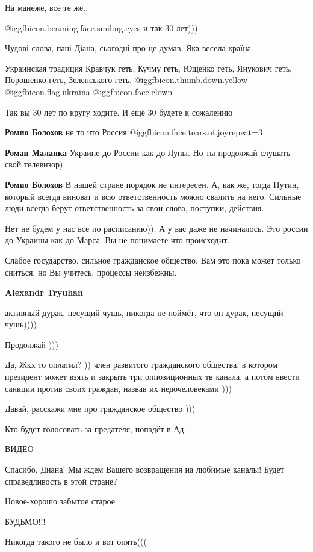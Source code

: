 \begin{itemize}
На манеже, всё те же..

 @igg{fbicon.beaming.face.smiling.eyes}  и так 30 лет)))

Чудові слова, пані Діана, сьогодні про це думав. Яка весела країна.


Украинская традиция Кравчук геть, Кучму геть, Ющенко геть, Янукович геть,
Порошенко геть, Зеленського геть. @igg{fbicon.thumb.down.yellow}
@igg{fbicon.flag.ukraina}  @igg{fbicon.face.clown} 


Так вы 30 лет по кругу ходите.
И ещё 30 будете к сожалению

\begin{itemize} %
\textbf{Ромио Болохов} не то что Россия  @igg{fbicon.face.tears.of.joy}{repeat=3} 

\textbf{Роман Маланка} Украине до России как до Луны. Но ты продолжай слушать свой телевизор)

\textbf{Ромио Болохов} В нашей стране порядок не интересен. А, как же, тогда Путин, который всегда виноват и всю ответственность можно свалить на него. Сильные люди всегда берут ответственность за свои слова, поступки, действия.


Нет не будем у нас всё по расписанию)). А у вас даже не начиналось. Это россии
до Украины как до Марса. Вы не понимаете что происходит.

Слабое государство, сильное гражданское общество. Вам это пока может только
сниться, но Вы учитесь, процессы неизбежны.

\textbf{Alexandr Tryuhan} 

активный дурак, несущий чушь, никогда не поймёт, что он дурак, несущий чушь))))

Продолжай )))

Да, Жкх то оплатил? )) член развитого гражданского общества, в котором
президент может взять и закрыть три оппозиционных тв канала, а потом ввести
санкции против своих граждан, назвав их недочеловеками )))

Давай, расскажи мне про гражданское общество )))

\end{itemize} %

Кто будет голосовать за предателя, попадёт в Ад.

ВИДЕО


Спасибо, Диана! Мы ждем Вашего возвращения на любимые каналы! Будет
справедливость в этой стране?

Новое-хорошо забытое старое

БУДЬМО!!!

Никогда такого не было и вот опять(((


\end{itemize} %
